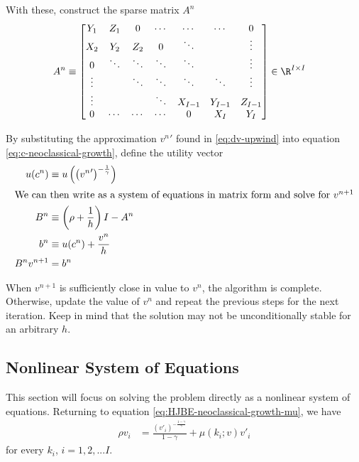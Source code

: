 \documentclass[11pt]{etk-article}
\begin{document}
With these, construct the sparse matrix $A^n$
\begin{align}
A^n &\equiv \begin{bmatrix}
Y_1 & Z_1 & 0 & \cdots & \cdots & \cdots & 0 \\
X_2 & Y_2 & Z_2 & 0 & \ddots& & \vdots \\
0 & \ddots & \ddots & \ddots & \ddots &  & \vdots \\
\vdots & &\ddots & \ddots & \ddots & \ddots  & \vdots \\
\vdots & & & \ddots & X_{I-1} & Y_{I-1}  & Z_{I-1} \\
0 & \cdots & \cdots & \cdots & 0 & X_I & Y_I\\
\end{bmatrix}\in\R^{I\times I}\label{eq:A}
\end{align}

By substituting the approximation ${v^{n}}'$ found in \cref{eq:dv-upwind} into equation \cref{eq:c-neoclassical-growth}, define the utility vector
\begin{align}
u(c^n) &\equiv u\left(\left({v^n}'\right)^{-\frac{1}{\gamma}}\right)\\
\intertext{We can then write as a system of equations in matrix form and solve for $v^{n+1}$}
B^n &\equiv \left(\rho + \frac{1}{h}\right)I - A^n\\
b^n &\equiv u(c^n) + \frac{v^n}{h}\\
B^{n}v^{n+1} &= {b^n}
\end{align}



When $v^{n+1}$ is sufficiently close in value to $v^n$, the algorithm is complete. Otherwise, update the value of $v^n$ and repeat the previous steps for the next iteration. Keep in mind that the solution may not be unconditionally stable for an arbitrary $h$.


\subsection{Nonlinear System of Equations}
This section will focus on solving the problem directly as a nonlinear system of equations. Returning to equation \cref{eq:HJBE-neoclassical-growth-mu}, we have 
\begin{align}
\rho v_i &= \frac{\left(v'_i\right)^{-\frac{1-\gamma}{\gamma}}}{1-\gamma} + \mu(k_i;v) v'_i
\end{align}
for every $k_i$, $i=1,2,...I$.


\end{document}

